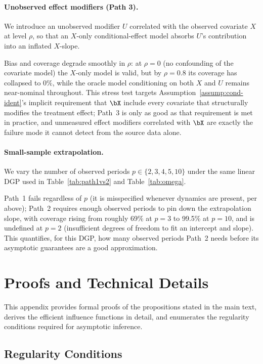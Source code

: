 \documentclass{article}
\begin{document}
\paragraph{Unobserved effect modifiers (Path 3).} We introduce an unobserved modifier $U$ correlated with the observed covariate $X$ at level $\rho$, so that an $X$-only conditional-effect model absorbs $U$'s contribution into an inflated $X$-slope.

Bias and coverage degrade smoothly in $\rho$: at $\rho=0$ (no confounding of the covariate model) the $X$-only model is valid, but by $\rho=0.8$ its coverage has collapsed to $0\%$, while the oracle model conditioning on both $X$ and $U$ remains near-nominal throughout. This stress test targets Assumption~\ref{assump:cond-ident}'s implicit requirement that $\bX$ include every covariate that structurally modifies the treatment effect; Path~3 is only as good as that requirement is met in practice, and unmeasured effect modifiers correlated with $\bX$ are exactly the failure mode it cannot detect from the source data alone.

\paragraph{Small-sample extrapolation.} We vary the number of observed periods $p \in \{2,3,4,5,10\}$ under the same linear DGP used in Table~\ref{tab:path1vs2} and Table~\ref{tab:omega}.

Path~1 fails regardless of $p$ (it is misspecified whenever dynamics are present, per above); Path~2 requires enough observed periods to pin down the extrapolation slope, with coverage rising from roughly 69\% at $p=3$ to 99.5\% at $p=10$, and is undefined at $p=2$ (insufficient degrees of freedom to fit an intercept and slope). This quantifies, for this DGP, how many observed periods Path~2 needs before its asymptotic guarantees are a good approximation.



\section{Proofs and Technical Details}

This appendix provides formal proofs of the propositions stated in the main text, derives the efficient influence functions in detail, and enumerates the regularity conditions required for asymptotic inference.

\subsection{Regularity Conditions}\label{app:regularity}
\end{document}
